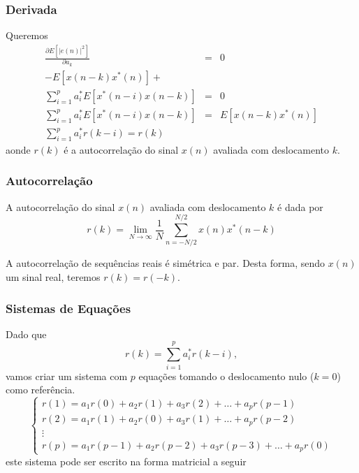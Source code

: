\begin{frame}%
  \frametitle{Derivada}
  Queremos
  \begin{eqnarray}
  \frac{\partial E\left[ \vert e(n) \vert^2 \right]}{\partial a_k} &=& 0  \\
  - E\left[ x(n-k) x^\ast(n) \right] + && \nonumber \\
   \sum_{i=1}^p a_i^\ast E\left[ x^\ast(n-i) x(n-k) \right] &=& 0 \nonumber \\
  \sum_{i=1}^p a_i^\ast E\left[ x^\ast(n-i) x(n-k) \right]  &=& E\left[ x(n-k) x^\ast(n) \right] \nonumber \\
  \sum_{i=1}^p a_i^\ast r(k-i) = r(k) \nonumber
  \end{eqnarray}
  aonde $r(k)$ é a autocorrelação do sinal $x(n)$ avaliada com deslocamento $k$.
\end{frame} 


\begin{frame}
  \frametitle{Autocorrelação}
  A autocorrelação do sinal $x(n)$ avaliada com deslocamento $k$ é dada por
  \begin{equation}
  r(k) = \lim_{N \rightarrow \infty} \frac{1}{N} \sum_{n=-N/2}^{N/2} x(n) x^\ast(n-k)
  \end{equation}

  A autocorrelação de sequências reais é simétrica e par. Desta forma, sendo $x(n)$ um sinal real,
  teremos $r(k) = r(-k)$.
\end{frame}

\begin{frame}
  \frametitle{Sistemas de Equações}
  Dado que
  \begin{equation}
  r(k) = \sum_{i=1}^p a_i^\ast r(k-i) ,
  \end{equation}
  vamos criar um sistema com $p$ equações tomando o deslocamento nulo ($k=0$) como referência.
  \begin{equation}
  \begin{cases} 
  r(1) = a_1 r(0) + a_2 r(1) + a_3 r(2) + \ldots + a_p r(p-1) \\
  r(2) = a_1 r(1) + a_2 r(0) + a_3 r(1) + \ldots + a_p r(p-2) \\
  \vdots \\
  r(p) = a_1 r(p-1) + a_2 r(p-2) + a_3 r(p-3) + \ldots + a_p r(0)  
  \end{cases} \nonumber
  \end{equation}
  este sistema pode ser escrito na forma matricial a seguir
\end{frame}

